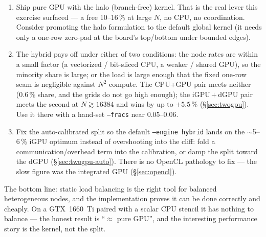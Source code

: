 \documentclass[
	english,
	letterpaper, oneside
]{article}
\begin{document}
\begin{enumerate}
	\item Ship pure GPU with the halo (branch-free) kernel. That is the real lever
	this exercise surfaced --- a free 10--16\,\% at large $N$, no CPU, no
	coordination. Consider promoting the halo formulation to the default global
	kernel (it needs only a one-row zero-pad at the board's top/bottom under bounded
	edges).
	\item The hybrid pays off under either of two conditions: the node rates are within a
	small factor (a vectorized / bit-sliced CPU, a weaker / shared GPU), so the minority
	share is large; or the load is large enough that the fixed one-row seam is negligible
	against $N^2$ compute. The CPU+GPU pair meets neither (0.6\,\% share, and the grids do
	not go high enough); the iGPU\,$+$\,dGPU pair meets the second at $N\gtrsim 16384$ and
	wins by up to $+5.5\,\%$ (\S\ref{sec:twogpu}). Use it there with a hand-set
	\texttt{--fracs} near $0.05$--$0.06$.
	\item Fix the auto-calibrated split so the default \texttt{--engine hybrid} lands on
	the $\sim$5--6\,\% iGPU optimum instead of overshooting into the cliff: fold a
	communication/overhead term into the calibration, or damp the split toward the dGPU
	(\S\ref{sec:twogpu-auto}). There is no OpenCL pathology to fix --- the slow figure was
	the integrated GPU (\S\ref{sec:opencl}).
\end{enumerate}

The bottom line: static load balancing is the right tool for balanced heterogeneous
nodes, and the implementation proves it can be done correctly and cheaply. On a
GTX~1660~Ti paired with a scalar CPU stencil it has nothing to balance --- the honest
result is ``$\approx$ pure GPU'', and the interesting performance story is the kernel,
not the split.
\end{document}
